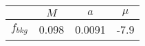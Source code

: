 \begin{tabular}{c||c|c|c}
 & $M$ & $a$ & $\mu$  \\
\hline
$f_{bkg}$  & 0.098 & 0.0091 & -7.9\\
\end{tabular}
